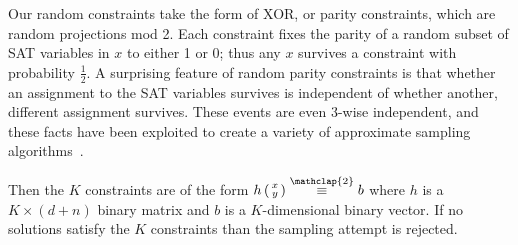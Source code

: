 \documentclass{article}
\newcommand\modt{\stackrel{\mathclap{\normalfont 2}}{\equiv}}
\begin{document}
  Our random constraints take the form of XOR, or parity constraints, which are random projections mod 2.
  Each constraint fixes the parity of a random subset of SAT variables in $x$ to either 1 or 0;
  thus any $x$ survives a constraint with probability $\frac{1}{2}$.
  A surprising feature of random parity constraints is that whether an assignment to the SAT variables survives is independent of whether another, different assignment survives.
  These events are even 3-wise independent, and these facts have been exploited to create a variety of approximate sampling algorithms~\cite{gomes2006near,valiant1985np,chakraborty2014balancing,gomes2006model}.
  
  Then the $K$ constraints are of the form $h\left(\begin{smallmatrix}x\\y\end{smallmatrix}\right) \modt b$ where $h$ is a $K\times (d+n)$ binary matrix and $b$ is a $K$-dimensional binary vector.
  If no solutions satisfy the $K$ constraints than the sampling attempt is rejected.
\end{document}
